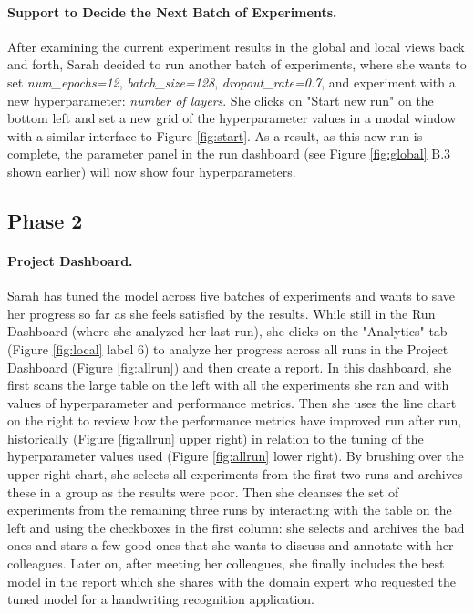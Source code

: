\documentclass[preprint]{vgtc}        %
\begin{document}
\paragraph{Support to Decide the Next Batch of Experiments.} After examining the current experiment results in the global and local views back and forth, Sarah decided to run another batch of experiments, where she wants to set \textit{num\_epochs=12}, \textit{batch\_size=128}, \textit{dropout\_rate=0.7}, and experiment with a new hyperparameter: \textit{number of layers}. She clicks on "Start new run" on the bottom left and set a new grid of the hyperparameter values in a modal window with a similar interface to Figure \ref{fig:start}. As a result, as this new run is complete, the parameter panel in the run dashboard (see Figure \ref{fig:global} B.3 shown earlier) will now show four hyperparameters.

\subsection{Phase 2}
\paragraph{Project Dashboard.} Sarah has tuned the model across five batches of experiments and wants to save her progress so far as she feels satisfied by the results. While still in the Run Dashboard (where she analyzed her last run), she clicks on the "Analytics" tab (Figure \ref{fig:local} label 6) to analyze her progress across all runs in the Project Dashboard (Figure \ref{fig:allrun}) and then create a report. In this dashboard, she first scans the large table on the left with all the experiments she ran and with values of hyperparameter and performance metrics. Then she uses the line chart on the right to review how the performance metrics have improved run after run, historically (Figure \ref{fig:allrun}    upper right) in relation to the tuning of the hyperparameter values used (Figure \ref{fig:allrun} lower right). By brushing over the upper right chart, she selects all experiments from the first two runs and archives these in a group as the results were poor. Then she cleanses the set of experiments from the remaining three runs by interacting with the table on the left and using the checkboxes in the first column: she selects and archives the bad ones and stars a few good ones that she wants to discuss and annotate with her colleagues. Later on, after meeting her colleagues, she finally includes the best model in the report which she shares with the domain expert who requested the tuned model for a handwriting recognition application. 
\end{document}
